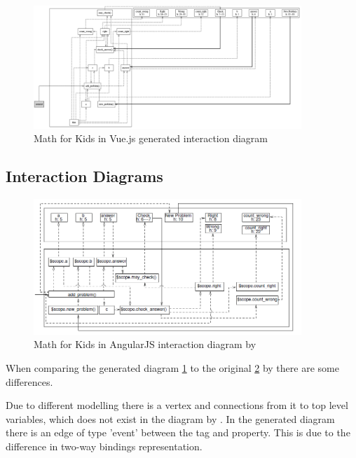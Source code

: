 \begin{figure}[H]
    \centering
    \includegraphics[width=0.9\textwidth]{images/diagram_own_math_kids.png}
     \caption{Math for Kids in Vue.js generated interaction diagram }
     \label{fig:math_for_kids_own_interaction_diagram}
\end{figure}


\subsection{Interaction Diagrams}
\begin{figure}[H]
    \centering
    \includegraphics[width=0.9\textwidth]{images/interaction_diagram_zhang.png}
     \caption{Math for Kids in AngularJS interaction diagram by \textcite{zhang2019scenario}}
     \label{fig:math_for_kids_zhang_interaction_diagram}
\end{figure}

When comparing the generated diagram \ref{fig:math_for_kids_own_interaction_diagram} to the original \ref{fig:math_for_kids_zhang_interaction_diagram} by \textcite{zhang2019scenario}  there are some differences.

Due to different modelling there is a  vertex and connections from it to top level variables, which does not exist in the diagram by \textcite{zhang2019scenario}. In the generated diagram there is an edge of type 'event' between the  tag and  property. This is due to the difference in two-way bindings representation.

